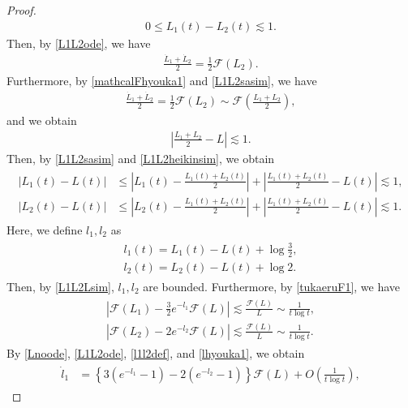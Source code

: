 \documentclass[reqno]{amsart}
\theoremstyle{plain}
\theoremstyle{definition}
\numberwithin{equation}{section}
\begin{document}
\begin{proof}
\begin{align}
0\leq L_1(t)-L_2(t)\lesssim 1.
\end{align}
Then, by \eqref{L1L2ode}, we have
\begin{align*}
\frac{\dot{L}_1+\dot{L}_2}{2}=\frac{1}{2}\mathcal{F}(L_2).
\end{align*}
Furthermore, by \eqref{mathcalFhyouka1} and \eqref{L1L2sasim}, we have
\begin{align*}
\frac{\dot{L}_1+\dot{L}_2}{2}=\frac{1}{2}\mathcal{F}(L_2)\sim \mathcal{F}\left(\frac{L_1+L_2}{2}\right),
\end{align*}
and we obtain
\begin{align}\label{L1L2heikinsim}
\left|\frac{L_1+L_2}{2}-L\right|\lesssim 1.
\end{align}
Then, by \eqref{L1L2sasim} and \eqref{L1L2heikinsim}, we obtain
\begin{align}\label{L1L2Lsim}
\begin{aligned}
|L_1(t)-L(t)|&\leq \left|L_1(t)-\frac{L_1(t)+L_2(t)}{2}\right|+\left|\frac{L_1(t)+L_2(t)}{2}-L(t)\right|\lesssim 1,
\\
|L_2(t)-L(t)|&\leq \left|L_2(t)-\frac{L_1(t)+L_2(t)}{2}\right|+\left|\frac{L_1(t)+L_2(t)}{2}-L(t)\right|\lesssim 1.
\end{aligned}
\end{align}
Here, we define $l_1,l_2$ as 
\begin{align}\label{l1l2def}
\begin{aligned}
l_1(t)=L_1(t)-L(t)+\log{\frac{3}{2}},
\\
l_2(t)=L_2(t)-L(t)+\log{2}.
\end{aligned}
\end{align}
Then, by \eqref{L1L2Lsim}, $l_1,l_2$ are bounded. Furthermore, by \eqref{tukaeruF1}, we have
\begin{align}\label{lhyouka1}
\begin{aligned}
\left|\mathcal{F}(L_1)-\frac{3}{2}e^{-l_1}\mathcal{F}(L)\right|\lesssim \frac{\mathcal{F}(L)}{L}\sim \frac{1}{t\log{t}},
\\
\left|\mathcal{F}(L_2)-2e^{-l_2}\mathcal{F}(L)\right|\lesssim \frac{\mathcal{F}(L)}{L}\sim \frac{1}{t\log{t}}.
\end{aligned}
\end{align}
By \eqref{Lnoode}, \eqref{L1L2ode}, \eqref{l1l2def}, and \eqref{lhyouka1}, we obtain
\begin{align}\label{LinoLyapunov1}
\begin{aligned}
\dot{l}_1&=\left\{3\left(e^{-l_1}-1\right)-2\left(e^{-l_2}-1\right)\right\}\mathcal{F}(L)+O\left(\frac{1}{t\log{t}}\right),

\end{aligned}
\end{align}
\end{proof}
\end{document}
